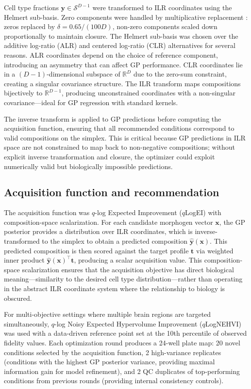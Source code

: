 \documentclass[times,twoside]{zHenriquesLab-StyleBioRxiv}
\newcommand{\Real}{\mathbb{R}}
\newcommand{\simplex}{\mathcal{S}}
\begin{document}
Cell type fractions $\bm{y} \in \simplex^{D-1}$ were transformed to ILR coordinates using the Helmert sub-basis. Zero components were handled by multiplicative replacement \cite{MartinFernandez2015}: zeros replaced by $\delta = 0.65 / (100D)$, non-zero components scaled down proportionally to maintain closure. The Helmert sub-basis was chosen over the additive log-ratio (ALR) and centered log-ratio (CLR) alternatives for several reasons. ALR coordinates depend on the choice of reference component, introducing an asymmetry that can affect GP performance. CLR coordinates lie in a $(D{-}1)$-dimensional subspace of $\Real^D$ due to the zero-sum constraint, creating a singular covariance structure. The ILR transform maps compositions bijectively to $\Real^{D-1}$, producing unconstrained coordinates with a non-singular covariance---ideal for GP regression with standard kernels.

The inverse transform is applied to GP predictions before computing the acquisition function, ensuring that all recommended conditions correspond to valid compositions on the simplex. This is critical because GP predictions in ILR space are not constrained to map back to non-negative compositions; without explicit inverse transformation and closure, the optimizer could exploit numerically valid but biologically impossible predictions.

\subsection*{Acquisition function and recommendation}

The acquisition function was $q$-log Expected Improvement ($q$LogEI) \cite{Balandat2020botorch} with composition-space scalarization. For each candidate morphogen vector $\bm{x}$, the GP posterior provides a distribution over ILR coordinates, which is inverse-transformed to the simplex to obtain a predicted composition $\hat{\bm{y}}(\bm{x})$. This predicted composition is then scored against the target profile $\bm{t}$ via weighted inner product $\hat{\bm{y}}(\bm{x})^\top \bm{t}$, producing a scalar acquisition value. This composition-space scalarization ensures that the acquisition objective has direct biological meaning---similarity to the desired cell type distribution---rather than operating in the abstract ILR coordinate system where the relationship to biology is obscured.

For multi-objective settings where multiple brain regions are targeted simultaneously, $q$-log Noisy Expected Hypervolume Improvement ($q$LogNEHVI) was used with a data-driven reference point set at the 10th percentile of observed fidelity values. Each optimization round produces a 24-well plate map: 20 novel conditions selected by the acquisition function, 2 high-variance replicates (conditions with the highest GP posterior variance, providing maximal information gain for model refinement), and 2 QC duplicates of top-performing conditions from previous rounds (providing internal consistency controls).
\end{document}
